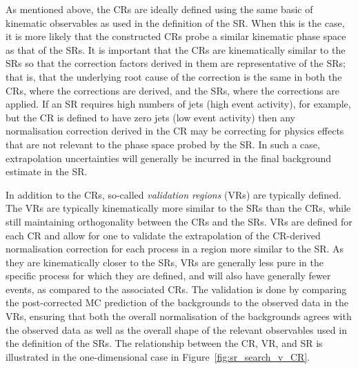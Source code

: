 As mentioned above, the CRs are ideally defined using the same basic of kinematic observables
as used in the definition of the SR.
When this is the case, it is more likely that the constructed CRs probe a similar kinematic
phase space as that of the SRs.
It is important that the CRs are kinematically similar to the SRs so that the correction factors
derived in them are representative of the SRs; that is, that the underlying root cause of the
correction is the same in both the CRs, where the corrections are derived, and the SRs, where
the corrections are applied.
If an SR requires high numbers of jets (high event activity), for example, but the CR is defined to have zero
jets (low event activity) then any normalisation correction derived in the CR may be correcting for physics effects
that are not relevant to the phase space probed by the SR.
In such a case, extrapolation uncertainties will generally be incurred in the final background estimate in the SR.

In addition to the CRs, so-called \textit{validation regions} (VRs) are typically defined.
The VRs are typically kinematically more similar to the SRs than the CRs, while still maintaining orthogonality
between the CRs and the SRs.
VRs are defined for each CR and allow for one to validate the extrapolation of the CR-derived normalisation
correction for each process in a region more similar to the SR.
As they are kinematically closer to the SRs, VRs are generally less pure in the specific process for which they are defined,
and will also have generally fewer events, as compared to the associated CRs.
The validation is done by comparing the post-corrected MC prediction of the backgrounds to the
observed data in the VRs, ensuring that both the overall normalisation of the backgrounds
agrees with the observed data as well as the overall shape of the relevant observables used
in the definition of the SRs.
The relationship between the CR, VR, and SR is illustrated in the one-dimensional case in
Figure~\ref{fig:sr_search_v_CR}.

